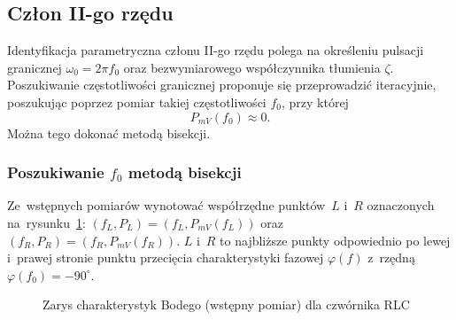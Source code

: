 \documentclass[paper=a4,DIV=12]{lpas}
\newcommand{\degree}{^{\circ}}
\begin{document}
\begin{appendices}
  \subsection{Człon II-go rzędu}
  \label{sec:YDUPM}

  Identyfikacja parametryczna członu II-go rzędu polega na określeniu pulsacji
  granicznej $\omega_0 = 2 \pi f_0$ oraz bezwymiarowego współczynnika tłumienia
  $\zeta$. Poszukiwanie częstotliwości granicznej proponuje się przeprowadzić
  iteracyjnie, poszukując poprzez pomiar takiej częstotliwości $f_0$, przy
  której
  \begin{equation}
    P_{mV}(f_0) \approx 0.
    \label{eq:8AO8B}
  \end{equation}
  Można tego dokonać metodą bisekcji.

  \subsubsection{Poszukiwanie \texorpdfstring{$f_0$}{f0} metodą bisekcji}
  \label{sec:HVY4X}

  Ze~wstępnych pomiarów wynotować współrzędne punktów~$L$ i~$R$ oznaczonych
  na~rysunku~\ref{fig:WC8TU}: $(f_L, P_L) = (f_L, P_{mV}(f_L))$ oraz $(f_R,
  P_R) = (f_R, P_{mV}(f_R))$. $L$ i~$R$ to najbliższe punkty odpowiednio po
  lewej i~prawej stronie punktu przecięcia charakterystyki fazowej $\varphi(f)$
  z~rzędną $\varphi(f_0) = - 90\degree$.

  \begin{figure}[H]
    \centering
    
    \caption{Zarys charakterystyk Bodego (wstępny pomiar) dla czwórnika RLC}
    \label{fig:WC8TU}
  \end{figure}


\end{appendices}
\end{document}
